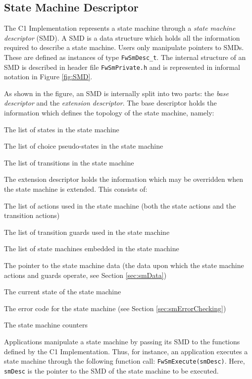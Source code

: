 \documentclass[a4paper,10pt]{article}
\newenvironment{fw_itemize}						%
{\begin{itemize}
  \setlength{\itemsep}{1mm}
  \setlength{\parskip}{0pt}
  \setlength{\parsep}{0pt}}
{\end{itemize}}
\begin{document}
\subsection{State Machine Descriptor}\label{sec:smDesc}
The C1 Implementation represents a state machine through a \emph{state machine descriptor} (SMD). 
A SMD is a data structure which holds all the information required to describe a state machine. 
Users only manipulate pointers to SMDs. These are defined as instances of type \texttt{FwSmDesc\_t}. The internal structure of an SMD is described in header file \texttt{FwSmPrivate.h} and is represented in informal notation in Figure \ref{fig:SMD}. 

As shown in the figure, an SMD is internally split into two parts: the \emph{base descriptor} and the \emph{extension descriptor}. The base descriptor holds the information which defines the topology of the state machine, namely:

\begin{fw_itemize}
\item The list of states in the state machine
\item The list of choice pseudo-states in the state machine
\item The list of transitions in the state machine
\end{fw_itemize}

The extension descriptor holds the information which may be overridden when the state machine 
is extended. This consists of:

\begin{fw_itemize}
\item The list of actions used in the state machine (both the state actions and the transition actions)
\item The list of transition guards used in the state machine
\item The list of state machines embedded in the state machine
\item The pointer to the state machine data (the data upon which the state machine actions 
and guards operate, see Section \ref{sec:smData})
\item The current state of the state machine
\item The error code for the state machine (see Section \ref{sec:smErrorChecking})
\item The state machine counters
\end{fw_itemize}

Applications manipulate a state machine by passing its SMD to the functions defined by 
the C1 Implementation. Thus, for instance, an application executes a state machine through the following function call: \texttt{FwSmExecute(smDesc)}. Here, \texttt{smDesc} is the pointer to the SMD of the state machine to be executed. 
\end{document}
